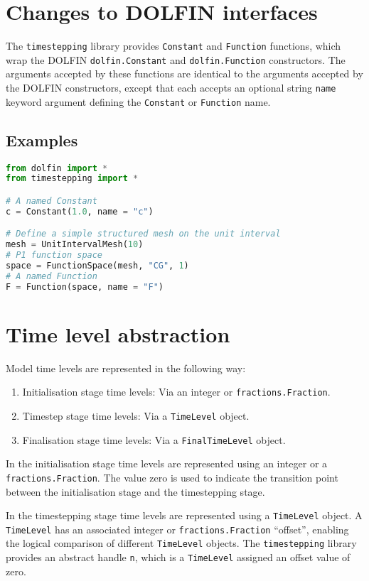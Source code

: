 \documentclass[a4paper]{book}
\begin{document}
\section{Changes to DOLFIN interfaces}\label{sect:wrappers}

The \verb+timestepping+ library provides \verb+Constant+ and \verb+Function+
functions, which wrap the DOLFIN \verb+dolfin.Constant+ and
\verb+dolfin.Function+ constructors. The arguments accepted by these functions
are identical to the arguments accepted by the DOLFIN constructors, except that
each accepts an optional string \verb+name+ keyword argument defining the
\verb+Constant+ or \verb+Function+ name.

\subsection*{Examples}

\begin{lstlisting}[language = python, frame = single, basicstyle=\footnotesize]
from dolfin import *
from timestepping import *

# A named Constant
c = Constant(1.0, name = "c")

# Define a simple structured mesh on the unit interval
mesh = UnitIntervalMesh(10)
# P1 function space
space = FunctionSpace(mesh, "CG", 1)
# A named Function
F = Function(space, name = "F")
\end{lstlisting}

\section{Time level abstraction}

Model time levels are represented in the following way:
\begin{enumerate}
  \item Initialisation stage time levels: Via an integer or
        \verb+fractions.Fraction+.
  \item Timestep stage time levels: Via a \verb+TimeLevel+ object.
  \item Finalisation stage time levels: Via a \verb+FinalTimeLevel+ object.
\end{enumerate}

In the initialisation stage time levels are represented using an integer
or a \verb+fractions.Fraction+. The value zero is used to indicate the
transition point between the initialisation stage and the timestepping stage.

In the timestepping stage time levels are represented using a \verb+TimeLevel+
object. A \verb+TimeLevel+ has an associated integer or
\verb+fractions.Fraction+ ``offset'', enabling the logical comparison of
different \verb+TimeLevel+ objects. The \verb+timestepping+ library provides
an abstract handle \verb+n+, which is a \linebreak \verb+TimeLevel+ assigned an
offset value of zero.
\end{document}

